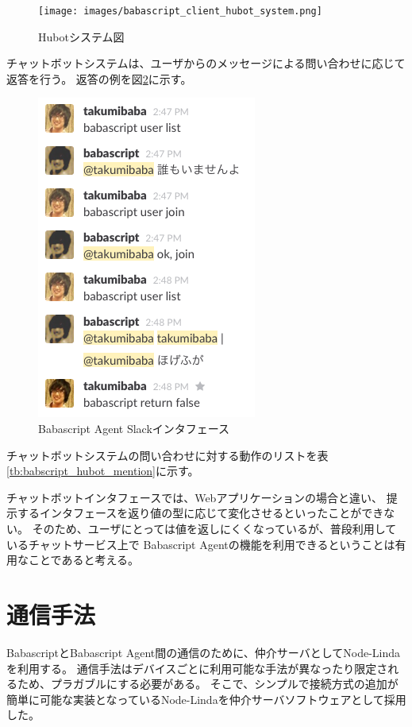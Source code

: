 \begin{figure}[htbp]
  \begin{center}
  \texttt{[image: images/babascript\_client\_hubot\_system.png]}
  \end{center}
  \caption{Hubotシステム図}
  \label{fig:babascript_client_hubot_system}
\end{figure}

チャットボットシステムは、ユーザからのメッセージによる問い合わせに応じて返答を行う。
返答の例を図\ref{fig:babascript_client_slack}に示す。

\begin{figure}[htbp]
  \begin{center}
  \includegraphics[width=.4\linewidth,bb=0 0 273 402]{images/babascript_client_slack.png}
  \end{center}
  \caption{Babascript Agent Slackインタフェース}
  \label{fig:babascript_client_slack}
\end{figure}

チャットボットシステムの問い合わせに対する動作のリストを表\ref{tb:babscript_hubot_mention}に示す。

チャットボットインタフェースでは、Webアプリケーションの場合と違い、
提示するインタフェースを返り値の型に応じて変化させるといったことができない。
そのため、ユーザにとっては値を返しにくくなっているが、普段利用しているチャットサービス上で
Babascript Agentの機能を利用できるということは有用なことであると考える。

\section{通信手法}\label{ux901aux4fe1ux624bux6cd5}

BabascriptとBabascript
Agent間の通信のために、仲介サーバとしてNode-Lindaを利用する。
通信手法はデバイスごとに利用可能な手法が異なったり限定されるため、プラガブルにする必要がある。
そこで、シンプルで接続方式の追加が簡単に可能な実装となっているNode-Lindaを仲介サーバソフトウェアとして採用した。

